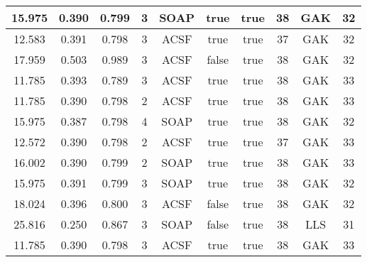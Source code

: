 \documentclass[12pt]{article}
\begin{document}
\begin{table}[H]
\begin{tabular}{|c|c|c|c|c|c|c|c|c|c|}
		15.975	& 0.390	& 0.799	& 3	& SOAP	& true	& true	& 38	& GAK	& 32	\\ \hline
		12.583	& 0.391	& 0.798	& 3	& ACSF	& true	& true	& 37	& GAK	& 32	\\ \hline
		17.959	& 0.503	& 0.989	& 3	& ACSF	& false	& true	& 38	& GAK	& 32	\\ \hline
		11.785	& 0.393	& 0.789	& 3	& ACSF	& true	& true	& 38	& GAK	& 33	\\ \hline
		11.785	& 0.390	& 0.798	& 2	& ACSF	& true	& true	& 38	& GAK	& 33	\\ \hline
		15.975	& 0.387	& 0.798	& 4	& SOAP	& true	& true	& 38	& GAK	& 32	\\ \hline
		12.572	& 0.390	& 0.798	& 2	& ACSF	& true	& true	& 37	& GAK	& 33	\\ \hline
		16.002	& 0.390	& 0.799	& 2	& SOAP	& true	& true	& 38	& GAK	& 33	\\ \hline
		15.975	& 0.391	& 0.799	& 3	& SOAP	& true	& true	& 38	& GAK	& 32	\\ \hline
		18.024	& 0.396	& 0.800	& 3	& ACSF	& false	& true	& 38	& GAK	& 32	\\ \hline
		25.816	& 0.250	& 0.867	& 3	& SOAP	& false	& true	& 38	& LLS	& 31	\\ \hline
		11.785	& 0.390	& 0.798	& 3	& ACSF	& true	& true	& 38	& GAK	& 33	\\ \hline
	\end{tabular}
	\label{tab:hyperopt}
\end{table}
\end{document}
